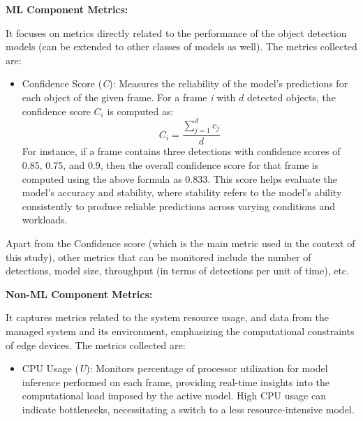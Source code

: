 \noindent
\textbf{ML Component Metrics:}

It focuses on metrics directly related to the performance of the object detection models (can be extended to other classes of models as well). The metrics collected are:

\begin{itemize}
    \item Confidence Score (\textit{C}): Measures the reliability of the model's predictions for each object of the given frame. For a frame \textit{i} with \(d\) detected objects, the confidence score \(C_i\) is computed as: 
    \[C_i = \frac{\sum_{j=1}^{d} c_j}{d}
    \] 
    For instance, if a frame contains three detections with confidence scores of 0.85, 0.75, and 0.9, then the overall confidence score for that frame is computed using the above formula as 0.833. This score helps evaluate the model's accuracy and stability, where stability refers to the model's ability  consistently to produce reliable predictions across varying conditions and workloads. 

\end{itemize}

Apart from the Confidence score (which is the main metric used in the context of this study), other metrics that can be monitored include the number of detections, model size, throughput (in terms of detections per unit of time), etc.

\noindent
\textbf{Non-ML Component Metrics:}

It captures metrics related to the system resource usage, and data from the managed system and its environment, emphasizing the computational constraints of edge devices. The metrics collected are:

\begin{itemize}
    \item CPU Usage (\textit{U}): Monitors percentage of processor utilization for model inference performed on each frame, providing real-time insights into the computational load imposed by the active model. High CPU usage can indicate bottlenecks, necessitating a switch to a less resource-intensive model. 


\end{itemize}

